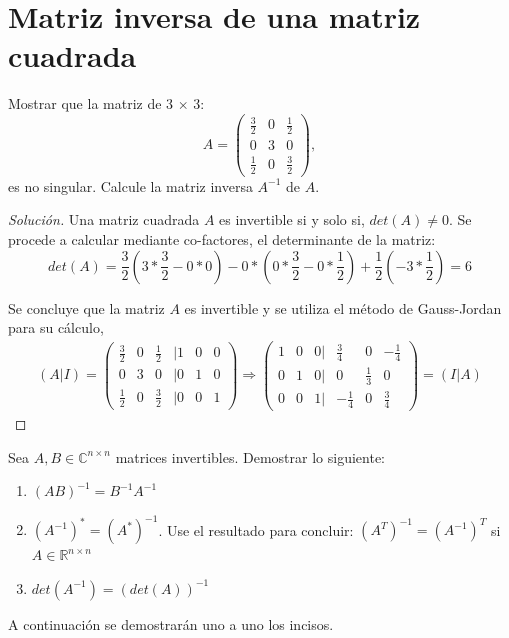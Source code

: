 \documentclass[12pt]{book}
\newcommand{\C}{\mathbb{C}}
\newcommand{\R}{\mathbb{R}}
\newenvironment{solucion}
  {\renewcommand\qedsymbol{$\square$}\begin{proof}[Solución]}
  {\end{proof}}
\begin{document}
\section{Matriz inversa de una matriz cuadrada}
\eje Mostrar que la matriz de 3 $\times$ 3: 
\[
A=\begin{pmatrix}
\frac{3}{2} & 0 & \frac{1}{2}\\
0 & 3 & 0\\
\frac{1}{2} & 0 & \frac{3}{2}
\end{pmatrix},
\]
es no singular. Calcule la matriz inversa $A^{-1}$ de $A$.
\begin{solucion}
Una matriz cuadrada $A$ es invertible si y solo si, $det(A)\neq 0$. Se procede a calcular mediante co-factores, el determinante de la matriz: 
    \[det(A)=\frac{3}{2}(3*\frac{3}{2}-0*0)-0*(0*\frac{3}{2}-0*\frac{1}{2})+\frac{1}{2}(-3*\frac{1}{2})=6\]

Se concluye que la matriz $A$ es invertible y se utiliza el método de Gauss-Jordan para su cálculo, 
    \begin{align*}
        (A|I)=
        \begin{pmatrix}
            \frac{3}{2} & 0 & \frac{1}{2}&|1&0&0\\
            0 & 3 & 0&|0&1&0\\
            \frac{1}{2} & 0 & \frac{3}{2}&|0&0&1
        \end{pmatrix}\Rightarrow \begin{pmatrix}
            1&0&0|&\frac{3}{4} & 0 & -\frac{1}{4}\\
            0&1&0|&0 & \frac{1}{3} & 0\\
            0&0&1|&-\frac{1}{4} & 0 & \frac{3}{4}
        \end{pmatrix}=(I|A)
    \end{align*}
\end{solucion}
\eje Sea $A, B\in\C^{n\times n}$ matrices invertibles. Demostrar lo siguiente:
\renewcommand{\labelenumi}{(\alph{enumi})}
\begin{enumerate}
    \item $(AB)^{-1}=B^{-1}A^{-1}$
    \item $(A^{-1})^{*}=(A^{*})^{-1}$. Use el resultado para concluir: $(A^{T})^{-1}=(A^{-1})^{T}$ si $A\in\R^{n\times n}$
    \item $det(A^{-1})=(det(A))^{-1}$
\end{enumerate}
A continuación se demostrarán uno a uno los incisos.
    \renewcommand{\labelenumi}{(\alph{enumi})}
\end{document}
